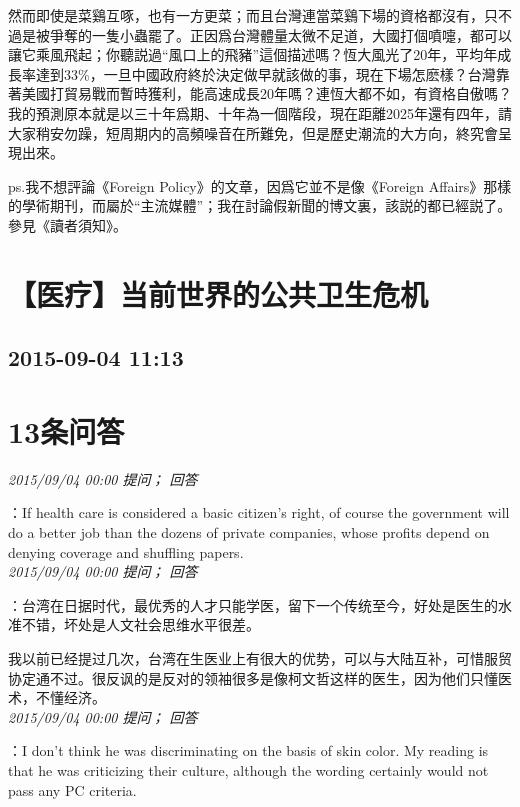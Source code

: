\documentclass[twocolumn]{ctexart}
\begin{document}
然而即使是菜鷄互啄，也有一方更菜；而且台灣連當菜鷄下場的資格都沒有，只不過是被爭奪的一隻小蟲罷了。正因爲台灣體量太微不足道，大國打個噴嚏，都可以讓它乘風飛起；你聽説過“風口上的飛豬”這個描述嗎？恆大風光了20年，平均年成長率達到33\%，一旦中國政府終於決定做早就該做的事，現在下場怎麽樣？台灣靠著美國打貿易戰而暫時獲利，能高速成長20年嗎？連恆大都不如，有資格自傲嗎？我的預測原本就是以三十年爲期、十年為一個階段，現在距離2025年還有四年，請大家稍安勿躁，短周期内的高頻噪音在所難免，但是歷史潮流的大方向，終究會呈現出來。

ps.我不想評論《Foreign Policy》的文章，因爲它並不是像《Foreign Affairs》那樣的學術期刊，而屬於“主流媒體”；我在討論假新聞的博文裏，該説的都已經説了。參見《讀者須知》。
\\


\section{【医疗】当前世界的公共卫生危机 }
\subsection{2015-09-04 11:13}


\section{13条问答}

\textit{\hfill\noindent\small 2015/09/04 00:00 提问； 回答}

：If health care is considered a basic citizen's right, of course the government will do a better job than the dozens of private companies, whose profits depend on denying coverage and shuffling papers.\\

\textit{\hfill\noindent\small 2015/09/04 00:00 提问； 回答}

：台湾在日据时代，最优秀的人才只能学医，留下一个传统至今，好处是医生的水准不错，坏处是人文社会思维水平很差。

我以前已经提过几次，台湾在生医业上有很大的优势，可以与大陆互补，可惜服贸协定通不过。很反讽的是反对的领袖很多是像柯文哲这样的医生，因为他们只懂医术，不懂经济。\\

\textit{\hfill\noindent\small 2015/09/04 00:00 提问； 回答}

：I don't think he was discriminating on the basis of skin color. My reading is that he was criticizing their culture, although the wording certainly would not pass any PC criteria.\\
\end{document}
